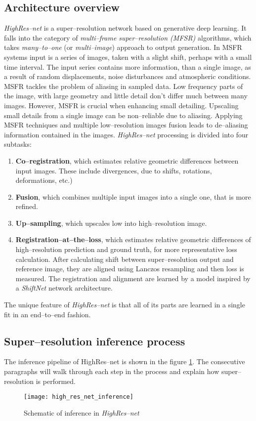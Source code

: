 \subsection{Architecture overview}
\textit{HighRes--net} \cite{deudon-2020-highresnet} is a super--resolution network based on generative deep learning.
It falls into the category of \textit{multi--frame super--resolution (MFSR)} algorithms, which takes \textit{many--to--one} (or \textit{multi--image}) approach to output generation.
In MSFR systems input is a series of images, taken with a slight shift, perhaps with a small time interval.
The input series contains more information, than a single image, as a result of random displacements, noise disturbances and atmospheric conditions.
MSFR tackles the problem of aliasing in sampled data.
Low frequency parts of the image, with large geometry and little detail don't differ much between many images.
However, MSFR is crucial when enhancing small detailing.
Upscaling small details from a single image can be non--reliable due to aliasing.
Applying MSFR techniques and multiple low--resolution images fusion leads to de--aliasing information contained in the images.
\textit{HighRes--net} processing is divided into four subtasks:
\begin{enumerate}
	\item \textbf{Co--registration}, which estimates relative geometric differences between input images. These include divergences, due to shifts, rotations, deformations, etc.)
	\item \textbf{Fusion}, which combines multiple input images into a single one, that is more refined.
	\item \textbf{Up--sampling}, which upscales low into high--resolution image.
	\item \textbf{Registration--at--the--loss}, which estimates relative geometric differences of high--resolution prediction and ground truth, for more representative loss calculation. After calculating shift between super--resolution output and reference image, they are aligned using Lanczos resampling and then loss is measured.
	    The registration and alignment are learned by a model inspired by a \textit{ShiftNet} network architecture.
\end{enumerate}
The unique feature of \textit{HighRes--net} is that all of its parts are learned in a single fit in an end--to--end fashion.

\subsection{Super--resolution inference process}
The inference pipeline of HighRes--net is shown in the figure \ref{fig:highresnet-inference}.
The consecutive paragraphs will walk through each step in the process and explain how super--resolution is performed.
\begin{figure}
    \centering
    \texttt{[image: high\_res\_net\_inference]}
    \caption{Schematic of inference in \textit{HighRes--net} \cite{deudon-2020-highresnet}}
    \label{fig:highresnet-inference}
\end{figure}

